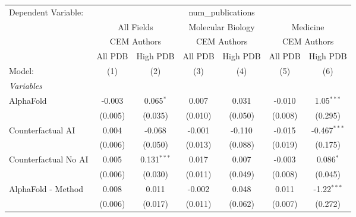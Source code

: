 \begingroup
\centering
\begin{tabular}{lcccccc}
   \tabularnewline \midrule \midrule
   Dependent Variable: & \multicolumn{6}{c}{num\_publications}\\
 & \multicolumn{2}{c}{All Fields} & \multicolumn{2}{c}{Molecular Biology} & \multicolumn{2}{c}{Medicine} \\
\cmidrule(lr){2-3} \cmidrule(lr){4-5} \cmidrule(lr){6-7}
 & \multicolumn{2}{c}{CEM Authors} & \multicolumn{2}{c}{CEM Authors} & \multicolumn{2}{c}{CEM Authors} \\
\cmidrule(lr){2-3} \cmidrule(lr){4-5} \cmidrule(lr){6-7}
 & \multicolumn{1}{c}{All PDB} & \multicolumn{1}{c}{High PDB} & \multicolumn{1}{c}{All PDB} & \multicolumn{1}{c}{High PDB} & \multicolumn{1}{c}{All PDB} & \multicolumn{1}{c}{High PDB} \\
\cmidrule(lr){2-2} \cmidrule(lr){3-3} \cmidrule(lr){4-4} \cmidrule(lr){5-5} \cmidrule(lr){6-6} \cmidrule(lr){7-7}
   Model:                                                     & (1)          & (2)           & (3)          & (4)     & (5)            & (6)\\  
   \midrule
   \emph{Variables}\\
   AlphaFold                                                  & -0.003       & 0.065$^{*}$   & 0.007        & 0.031   & -0.010         & 1.05$^{***}$\\   
                                                              & (0.005)      & (0.035)       & (0.010)      & (0.050) & (0.008)        & (0.295)\\   
   Counterfactual AI                                          & 0.004        & -0.068        & -0.001       & -0.110  & -0.015         & -0.467$^{***}$\\   
                                                              & (0.006)      & (0.050)       & (0.013)      & (0.088) & (0.019)        & (0.175)\\   
   Counterfactual No AI                                       & 0.005        & 0.131$^{***}$ & 0.017        & 0.007   & -0.003         & 0.086$^{*}$\\   
                                                              & (0.006)      & (0.030)       & (0.011)      & (0.049) & (0.008)        & (0.045)\\   
   AlphaFold - Method                                         & 0.008        & 0.011         & -0.002       & 0.048   & 0.011          & -1.22$^{***}$\\   
                                                              & (0.006)      & (0.017)       & (0.011)      & (0.062) & (0.007)        & (0.272)\\   

\end{tabular}
